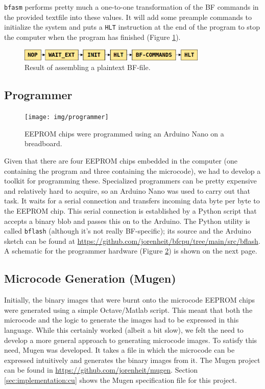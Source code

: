 \texttt{bfasm} performs pretty much a one-to-one transformation of the BF commands in the provided textfile into these values. It will add some preample commands to initialize the system and puts a \texttt{HLT} instruction at the end of the program to stop the computer when the program has finished (Figure \ref{fig:assembleoutput}).

\begin{figure}[H]
  \centering
  \includegraphics[width=0.8\textwidth]{img/assembleroutput}
  \caption{Result of assembling a plaintext BF-file.}
  \label{fig:assembleoutput}
\end{figure}


\subsection{Programmer} \label{sec:utilities:bflash}

\begin{figure}[H]
  \centering
  \texttt{[image: img/programmer]}
  \caption{EEPROM chips were programmed using an Arduino Nano on a breadboard.}
  \label{fig:programmer}
\end{figure}

Given that there are four EEPROM chips embedded in the computer (one containing the program and three containing the microcode), we had to develop a toolkit for programming these. Specialized programmers can be pretty expensive and relatively hard to acquire, so an Arduino Nano was used to carry out that task. It waits for a serial connection and transfers incoming data byte per byte to the EEPROM chip. This serial connection is established by a Python script that accepts a binary blob and passes this on to the Arduino. The Python utility is called \texttt{bflash} (although it's not really BF-specific); its source and the Arduino sketch can be found at \url{https://github.com/jorenheit/bfcpu/tree/main/src/bflash}. A schematic for the programmer hardware (Figure \ref{fig:programmer}) is shown on the next page.



\subsection{Microcode Generation (Mugen)} \label{sec:utilities:mugen}
Initially, the binary images that were burnt onto the microcode EEPROM chips were generated using a simple Octave/Matlab script. This meant that both the microcode and the logic to generate the images had to be expressed in this language. While this certainly worked (albeit a bit slow), we felt the need to develop a more general approach to generating microcode images. To satisfy this need, Mugen was developed. It takes a file in which the microcode can be expressed intuitively and generates the binary images from it. The Mugen project can be found in \url{https://github.com/jorenheit/mugen}. Section \ref{sec:implementation:cu} shows the Mugen specification file for this project. 

